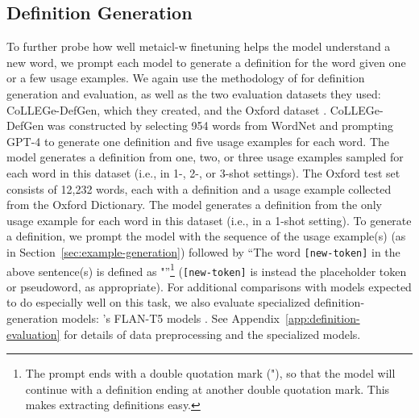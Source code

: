 \documentclass{article}
\begin{document}
\subsection{Definition Generation}
\label{sec:definition-generation}
To further probe how well \ac{metaicl-w} finetuning helps the model understand a new word, we prompt each model to generate a definition for the word given one or a few usage examples.
We again use the methodology of \citet{Teehan2024CoLLEGeCE} for definition generation and evaluation, as well as the two evaluation datasets they used: CoLLEGe-DefGen, which they created, and the Oxford dataset \citep{gadetsky-etal-2018-conditional}.
CoLLEGe-DefGen was constructed by selecting 954 words from WordNet \citep{WordNet} and prompting \mbox{GPT-4} \citep{GPT4} to generate one definition and five usage examples for each word.
The model generates a definition from one, two, or three usage examples sampled for each word in this dataset (i.e., in 1-, 2-, or 3-shot settings).
The Oxford test set consists of 12,232 words, each with a definition and a usage example collected from the Oxford Dictionary.
The model generates a definition from the only usage example for each word in this dataset (i.e., in a 1-shot setting).
To generate a definition, we prompt the model with the sequence of the usage example(s) (as in Section~\ref{sec:example-generation}) followed by ``The word \texttt{[new-token]} in the above sentence(s) is defined as "''\footnote{The prompt ends with a double quotation mark ("), so that the model will continue with a definition ending at another double quotation mark. This makes extracting definitions easy.} (\texttt{[new-token]} is instead the placeholder token or pseudoword, as appropriate).
For additional comparisons with models expected to do especially well on this task, we also evaluate specialized definition-generation models: \citeauthor{giulianelli-etal-2023-interpretable}'s \citeyearpar{giulianelli-etal-2023-interpretable} \mbox{FLAN-T5} models \citep{chung2024scaling}.
See Appendix~\ref{app:definition-evaluation} for details of data preprocessing and the specialized models.
\end{document}
